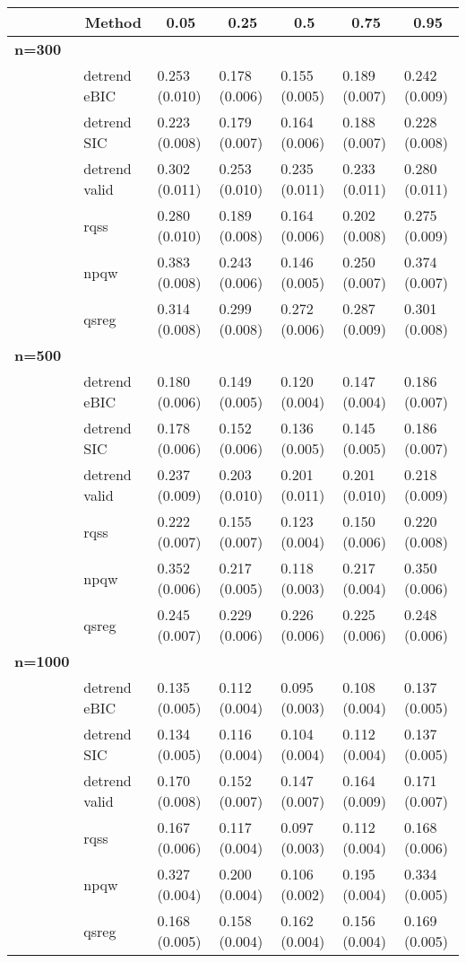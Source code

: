 \begin{table}[!tbp]
\begin{center}
\begin{tabular}{lllllll}
\hline\hline
\multicolumn{1}{l}{}&\multicolumn{1}{c}{Method}&\multicolumn{1}{c}{0.05}&\multicolumn{1}{c}{0.25}&\multicolumn{1}{c}{0.5}&\multicolumn{1}{c}{0.75}&\multicolumn{1}{c}{0.95}\tabularnewline
\hline
{\bfseries n=300}&&&&&&\tabularnewline
~~&detrend eBIC&0.253 (0.010)&0.178 (0.006)&0.155 (0.005)&0.189 (0.007)&0.242 (0.009)\tabularnewline
~~&detrend SIC&0.223 (0.008)&0.179 (0.007)&0.164 (0.006)&0.188 (0.007)&0.228 (0.008)\tabularnewline
~~&detrend valid&0.302 (0.011)&0.253 (0.010)&0.235 (0.011)&0.233 (0.011)&0.280 (0.011)\tabularnewline
~~&rqss&0.280 (0.010)&0.189 (0.008)&0.164 (0.006)&0.202 (0.008)&0.275 (0.009)\tabularnewline
~~&npqw&0.383 (0.008)&0.243 (0.006)&0.146 (0.005)&0.250 (0.007)&0.374 (0.007)\tabularnewline
~~&qsreg&0.314 (0.008)&0.299 (0.008)&0.272 (0.006)&0.287 (0.009)&0.301 (0.008)\tabularnewline
\hline
{\bfseries n=500}&&&&&&\tabularnewline
~~&detrend eBIC&0.180 (0.006)&0.149 (0.005)&0.120 (0.004)&0.147 (0.004)&0.186 (0.007)\tabularnewline
~~&detrend SIC&0.178 (0.006)&0.152 (0.006)&0.136 (0.005)&0.145 (0.005)&0.186 (0.007)\tabularnewline
~~&detrend valid&0.237 (0.009)&0.203 (0.010)&0.201 (0.011)&0.201 (0.010)&0.218 (0.009)\tabularnewline
~~&rqss&0.222 (0.007)&0.155 (0.007)&0.123 (0.004)&0.150 (0.006)&0.220 (0.008)\tabularnewline
~~&npqw&0.352 (0.006)&0.217 (0.005)&0.118 (0.003)&0.217 (0.004)&0.350 (0.006)\tabularnewline
~~&qsreg&0.245 (0.007)&0.229 (0.006)&0.226 (0.006)&0.225 (0.006)&0.248 (0.006)\tabularnewline
\hline
{\bfseries n=1000}&&&&&&\tabularnewline
~~&detrend eBIC&0.135 (0.005)&0.112 (0.004)&0.095 (0.003)&0.108 (0.004)&0.137 (0.005)\tabularnewline
~~&detrend SIC&0.134 (0.005)&0.116 (0.004)&0.104 (0.004)&0.112 (0.004)&0.137 (0.005)\tabularnewline
~~&detrend valid&0.170 (0.008)&0.152 (0.007)&0.147 (0.007)&0.164 (0.009)&0.171 (0.007)\tabularnewline
~~&rqss&0.167 (0.006)&0.117 (0.004)&0.097 (0.003)&0.112 (0.004)&0.168 (0.006)\tabularnewline
~~&npqw&0.327 (0.004)&0.200 (0.004)&0.106 (0.002)&0.195 (0.004)&0.334 (0.005)\tabularnewline
~~&qsreg&0.168 (0.005)&0.158 (0.004)&0.162 (0.004)&0.156 (0.004)&0.169 (0.005)\tabularnewline
\hline
\end{tabular}\end{center}
\end{table}
